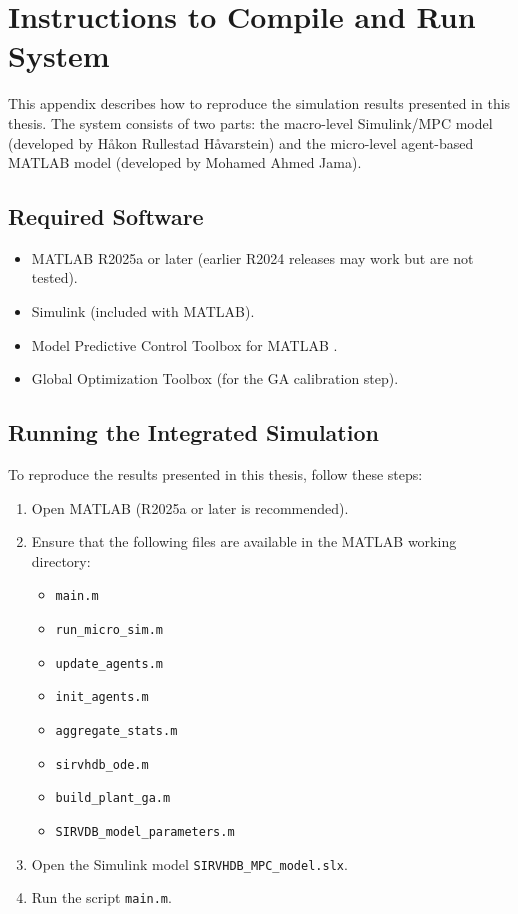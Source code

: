 

\chapter{Instructions to Compile and Run System}
\label{apx:instructions}

This appendix describes how to reproduce the simulation results presented in this thesis.
The system consists of two parts: the macro-level Simulink/MPC model (developed by H\aa{}kon Rullestad H\aa{}varstein) and the micro-level agent-based MATLAB model (developed by Mohamed Ahmed Jama).

\section{Required Software}
\label{apx:software}

\begin{itemize}
  \item MATLAB R2025a or later (earlier R2024 releases may work but are not tested).
  \item Simulink (included with MATLAB).
  \item Model Predictive Control Toolbox for MATLAB \citep{mathworks2025}.
  \item Global Optimization Toolbox (for the GA calibration step).
\end{itemize}

\section{Running the Integrated Simulation}
\label{apx:run}

To reproduce the results presented in this thesis, follow these steps:

\begin{enumerate}
  \item Open MATLAB (R2025a or later is recommended).
  \item Ensure that the following files are available in the MATLAB working directory:
    \begin{itemize}
      \item \texttt{main.m}
      \item \texttt{run\_micro\_sim.m}
      \item \texttt{update\_agents.m}
      \item \texttt{init\_agents.m}
      \item \texttt{aggregate\_stats.m}
      \item \texttt{sirvhdb\_ode.m}
      \item \texttt{build\_plant\_ga.m}
      \item \texttt{SIRVDB\_model\_parameters.m}
    \end{itemize}
  \item Open the Simulink model \texttt{SIRVHDB\_MPC\_model.slx}.
  \item Run the script \texttt{main.m}.
\end{enumerate}


